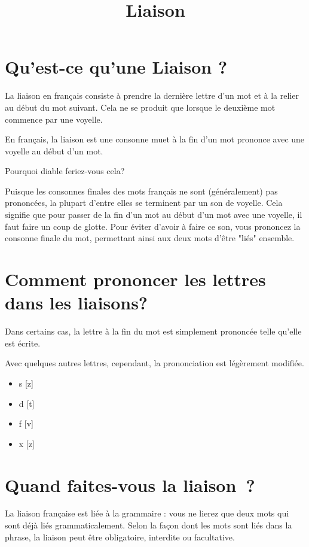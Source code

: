 \documentclass{article}
\begin{document}
\title{Liaison}
\date{}
\begin{titlepage}
  \maketitle{}
  \tableofcontents{}
\end{titlepage}

\section{Qu'est-ce qu'une Liaison ?}

La liaison en français consiste à prendre la dernière lettre d'un mot et à la relier au début du mot suivant.
Cela ne se produit que lorsque le deuxième mot commence par une voyelle.

En français, la liaison est une consonne muet à la fin d'un mot prononce avec une voyelle au début d'un mot.


Pourquoi diable feriez-vous cela?

Puisque les consonnes finales des mots français ne sont (généralement) pas prononcées, la plupart d'entre elles se terminent par un son de voyelle.
Cela signifie que pour passer de la fin d'un mot au début d'un mot avec une voyelle, il faut faire un coup de glotte.
Pour éviter d'avoir à faire ce son, vous prononcez la consonne finale du mot, permettant ainsi aux deux mots d'être "liés" ensemble.

\section{Comment prononcer les lettres dans les liaisons?}

Dans certains cas, la lettre à la fin du mot est simplement prononcée telle qu'elle est écrite.

Avec quelques autres lettres, cependant, la prononciation est légèrement modifiée.
\begin{itemize}
\item s [z]
\item d [t]
\item f [v]
\item x [z]
\end{itemize}


\section{Quand faites-vous la liaison ?}

La liaison française est liée à la grammaire : vous ne lierez que deux mots qui sont déjà liés grammaticalement.
Selon la façon dont les mots sont liés dans la phrase, la liaison peut être obligatoire, interdite ou facultative.
\end{document}

